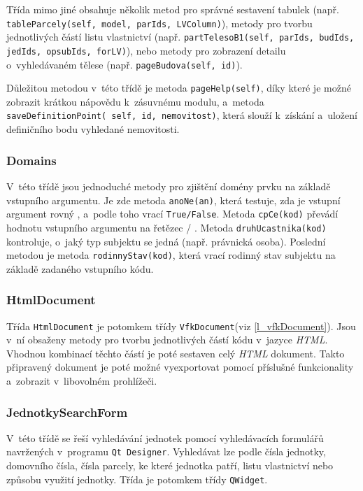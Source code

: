 \documentclass[a4paper,12pt,oneside]{book}
\begin{document}
Třída mimo jiné obsahuje několik metod pro správné sestavení tabulek
(např. \texttt{tableParcely(self, model, parIds, LVColumn)}), metody
pro tvorbu jednotlivých částí listu vlastnictví
(např. \texttt{partTelesoB1(self, parIds, budIds, jedIds, opsubIds,
  forLV)}), nebo metody pro zobrazení detailu o~vyhledávaném tělese
(např. \texttt{pageBudova(self, id)}).

Důležitou metodou v~této třídě je metoda \texttt{pageHelp(self)}, díky
které je možné zobrazit krátkou nápovědu k~zásuvnému modulu, a~metoda
\texttt{saveDefinitionPoint( self, id, nemovitost)}, která slouží
k~získání a~uložení definičního bodu vyhledané nemovitosti.

\subsubsection{Domains}
V~této třídě jsou jednoduché metody pro zjištění domény prvku na
základě vstupního argumentu. Je zde metoda \texttt{anoNe(an)}, která
testuje, zda je vstupní argument rovný , a~podle toho vrací
\texttt{True/False}. Metoda \texttt{cpCe(kod)} převádí hodnotu
vstupního argumentu na řetězec  / . Metoda \texttt{druhUcastnika(kod)} kontroluje, o~jaký
typ subjektu se jedná (např. právnická osoba). Poslední metodou je
metoda \texttt{rodinnyStav(kod)}, která vrací rodinný stav subjektu na
základě zadaného vstupního kódu.

\subsubsection{HtmlDocument}
Třída \texttt{HtmlDocument} je potomkem třídy \texttt{VfkDocument}(viz
\ref{l_vfkDocument}). Jsou v~ní obsaženy metody pro tvorbu
jednotlivých částí kódu v~jazyce \textit{HTML}. Vhodnou kombinací
těchto částí je poté sestaven celý \textit{HTML} dokument. Takto
připravený dokument je poté možné vyexportovat pomocí příslušné
funkcionality a~zobrazit v~libovolném prohlížeči.

\subsubsection{JednotkySearchForm}
V~této třídě se řeší vyhledávání jednotek pomocí vyhledávacích
formulářů navržených v~programu \texttt{Qt Designer}. Vyhledávat lze
podle čísla jednotky, domovního čísla, čísla parcely, ke které
jednotka patří, listu vlastnictví nebo způsobu využití jednotky. Třída
je potomkem třídy \texttt{QWidget}.
\end{document}
